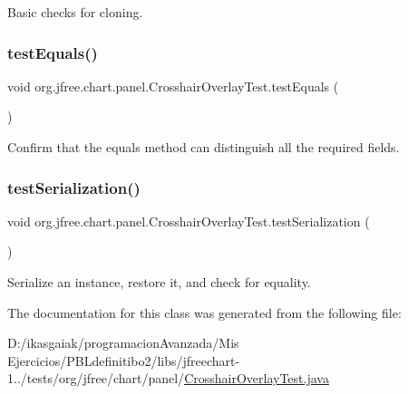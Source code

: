 Basic checks for cloning. \mbox{\label{classorg_1_1jfree_1_1chart_1_1panel_1_1_crosshair_overlay_test_a38babfdf3ce97fa9c4d2d19e62dec939}} 
\subsubsection{\texorpdfstring{test\+Equals()}{testEquals()}}
{\footnotesize\ttfamily void org.\+jfree.\+chart.\+panel.\+Crosshair\+Overlay\+Test.\+test\+Equals (\begin{DoxyParamCaption}{ }\end{DoxyParamCaption})}

Confirm that the equals method can distinguish all the required fields. \mbox{\label{classorg_1_1jfree_1_1chart_1_1panel_1_1_crosshair_overlay_test_aad0a1900f50a8dbd69767b68e25a647b}} 
\subsubsection{\texorpdfstring{test\+Serialization()}{testSerialization()}}
{\footnotesize\ttfamily void org.\+jfree.\+chart.\+panel.\+Crosshair\+Overlay\+Test.\+test\+Serialization (\begin{DoxyParamCaption}{ }\end{DoxyParamCaption})}

Serialize an instance, restore it, and check for equality. 

The documentation for this class was generated from the following file\+:\begin{DoxyCompactItemize}
\item 
D\+:/ikasgaiak/programacion\+Avanzada/\+Mis Ejercicios/\+P\+B\+Ldefinitibo2/libs/jfreechart-\/1../tests/org/jfree/chart/panel/\mbox{\hyperlink{_crosshair_overlay_test_8java}{Crosshair\+Overlay\+Test.\+java}}\end{DoxyCompactItemize}
